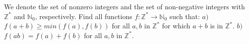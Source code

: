 We denote the set of nonzero integers and the set of non-negative integers with $\mathbb Z^*$ and $\mathbb N_0$, respectively. Find all functions $f:\mathbb Z^* \to \mathbb N_0$ such that:
$a)$ $f(a+b)\geq min(f(a), f(b))$ for all $a,b$ in $\mathbb Z^*$ for which $a+b$ is in $\mathbb Z^*$.
$b)$ $f(ab)=f(a)+f(b)$ for all $a,b$ in $\mathbb Z^*$.